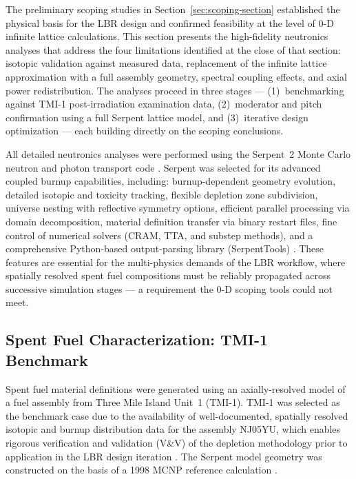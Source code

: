 
The preliminary scoping studies in Section~\ref{sec:scoping-section} established the physical basis for the LBR design and confirmed feasibility at the level of 0-D infinite lattice calculations. This section presents the high-fidelity neutronics analyses that address the four limitations identified at the close of that section: isotopic validation against measured data, replacement of the infinite lattice approximation with a full assembly geometry, spectral coupling effects, and axial power redistribution. The analyses proceed in three stages --- (1)~benchmarking against TMI-1 post-irradiation examination data, (2)~moderator and pitch confirmation using a full Serpent lattice model, and (3)~iterative design optimization --- each building directly on the scoping conclusions.

All detailed neutronics analyses were performed using the Serpent~2 Monte Carlo neutron and photon transport code \cite{Leppanen2025Status2024}. Serpent was selected for its advanced coupled burnup capabilities, including: burnup-dependent geometry evolution, detailed isotopic and toxicity tracking, flexible depletion zone subdivision, universe nesting with reflective symmetry options, efficient parallel processing via domain decomposition, material definition transfer via binary restart files, fine control of numerical solvers (CRAM, TTA, and substep methods), and a comprehensive Python-based output-parsing library (SerpentTools) \cite{Johnson2020SerpentTools:Serpent}. These features are essential for the multi-physics demands of the LBR workflow, where spatially resolved spent fuel compositions must be reliably propagated across successive simulation stages --- a requirement the 0-D scoping tools could not meet.

\subsection{Spent Fuel Characterization: TMI-1 Benchmark }

Spent fuel material definitions were generated using an axially-resolved model of a fuel assembly from Three Mile Island Unit~1 (TMI-1). TMI-1 was selected as the benchmark case due to the availability of well-documented, spatially resolved isotopic and burnup distribution data for the assembly NJ05YU, which enables rigorous verification and validation (V\&V) of the depletion methodology prior to application in the LBR design iteration \cite{Wolf2000AnalysisReport}. The Serpent model geometry was constructed on the basis of a 1998 MCNP reference calculation \cite{Wright1998CRCI.}.

